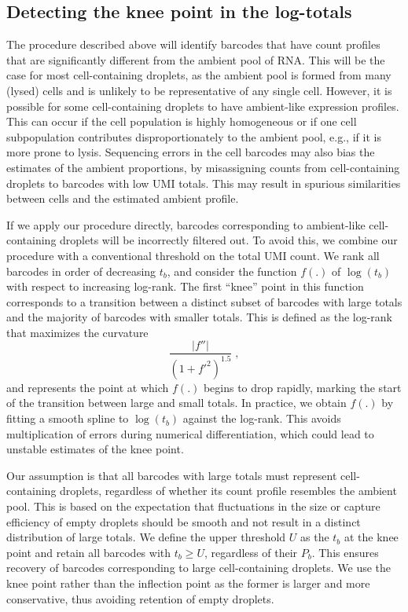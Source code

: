 \documentclass[10pt,letterpaper]{article}
\begin{document}
\subsection*{Detecting the knee point in the log-totals}
The procedure described above will identify barcodes that have count profiles that are significantly different from the ambient pool of RNA.
This will be the case for most cell-containing droplets, as the ambient pool is formed from many (lysed) cells and is unlikely to be representative of any single cell.
However, it is possible for some cell-containing droplets to have ambient-like expression profiles.
This can occur if the cell population is highly homogeneous or if one cell subpopulation contributes disproportionately to the ambient pool, e.g., if it is more prone to lysis.
Sequencing errors in the cell barcodes may also bias the estimates of the ambient proportions, by misassigning counts from cell-containing droplets to barcodes with low UMI totals.
This may result in spurious similarities between cells and the estimated ambient profile.

If we apply our procedure directly, barcodes corresponding to ambient-like cell-containing droplets will be incorrectly filtered out.
To avoid this, we combine our procedure with a conventional threshold on the total UMI count.
We rank all barcodes in order of decreasing $t_b$, and consider the function $f(.)$ of $\log(t_b)$ with respect to increasing log-rank.
The first ``knee'' point in this function corresponds to a transition between a distinct subset of barcodes with large totals and the majority of barcodes with smaller totals.
This is defined as the log-rank that maximizes the curvature
\[
    \frac{|f''|}{(1 + f'^2)^{1.5}} \;,
\]
and represents the point at which $f(.)$ begins to drop rapidly, marking the start of the transition between large and small totals.
In practice, we obtain $f(.)$ by fitting a smooth spline to $\log(t_b)$ against the log-rank.
This avoids multiplication of errors during numerical differentiation, which could lead to unstable estimates of the knee point.

Our assumption is that all barcodes with large totals must represent cell-containing droplets, regardless of whether its count profile resembles the ambient pool.
This is based on the expectation that fluctuations in the size or capture efficiency of empty droplets should be smooth and not result in a distinct distribution of large totals.
We define the upper threshold $U$ as the $t_b$ at the knee point and retain all barcodes with $t_b \ge U$, regardless of their $P_b$.
This ensures recovery of barcodes corresponding to large cell-containing droplets. 
We use the knee point rather than the inflection point as the former is larger and more conservative, thus avoiding retention of empty droplets.
\end{document}
